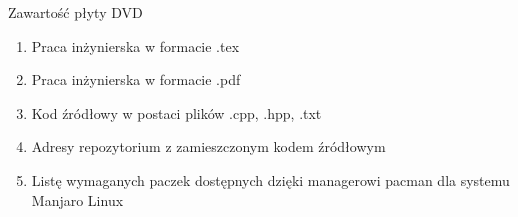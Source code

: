 \cleardoublepage
{}
\thispagestyle{plain}

{}

Zawartość płyty DVD
\begin{enumerate}
\item Praca inżynierska w formacie .tex
\item Praca inżynierska w formacie .pdf
\item Kod źródłowy w postaci plików .cpp, .hpp, .txt
\item Adresy repozytorium z zamieszczonym kodem źródłowym
\item Listę wymaganych paczek dostępnych dzięki managerowi pacman dla systemu Manjaro Linux
\end{enumerate}

\restoregeometry
\makeatother
